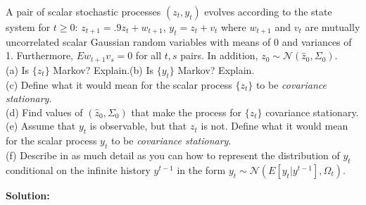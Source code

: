 \documentclass[12pt, letterpaper]{article}
\begin{document}
\begin{tcolorbox}[evenbox,title={Exercise 2.24 \quad Stationarity}]
\begin{tcolorbox}[questionbox]
A pair of scalar stochastic processes $(z_t,y_t)$ evolves according to the state system for $t\ge0$:
$z_{t+1}=.9z_t+w_{t+1}$, $y_t=z_t+v_t$ where $w_{t+1}$ and $v_t$ are mutually uncorrelated scalar
Gaussian random variables with means of 0 and variances of 1. Furthermore, $Ew_{t+1}v_s=0$ for all
$t,s$ pairs. In addition, $z_0\sim\mathcal N(\hat z_0,\Sigma_0)$.\\[3pt]
(a) Is $\{z_t\}$ Markov? Explain.\quad (b) Is $\{y_t\}$ Markov? Explain.\\
(c) Define what it would mean for the scalar process $\{z_t\}$ to be \textit{covariance stationary}.\\
(d) Find values of $(\hat z_0,\Sigma_0)$ that make the process for $\{z_t\}$ covariance stationary.\\
(e) Assume that $y_t$ is observable, but that $z_t$ is not. Define what it would mean for the scalar
process $y_t$ to be \textit{covariance stationary}.\\
(f) Describe in as much detail as you can how to represent the distribution of $y_t$ conditional on
the infinite history $y^{t-1}$ in the form $y_t\sim\mathcal N(E[y_t|y^{t-1}],\Omega_t)$.
\end{tcolorbox}

\textbf{Solution:}


\end{tcolorbox}
\end{document}
